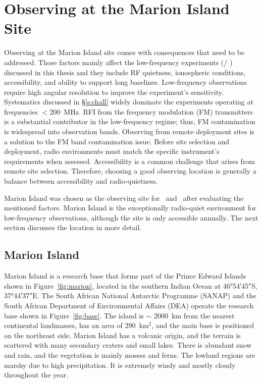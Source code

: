 \chapter{Observing at the Marion Island Site}

Observing at the Marion Island site comes with consequences that need to be addressed. Those factors mainly affect the low-frequency experiments (\prizm / \albatros) discussed in this thesis and they include RF quietness, ionospheric conditions, accessibility, and ability to support long baselines. Low-frequency observations require high angular resolution to improve the experiment's sensitivity. Systematics discussed in \S\ref{s:chall} widely dominate the experiments operating at frequencies $<$\SI{200}{MHz}. RFI from the frequency modulation (FM) transmitters is a substantial contributor in the low-frequency regime; thus, FM contamination is widespread into observation bands. Observing from remote deployment sites is a solution to the FM band contamination issue. Before site selection and deployment, radio environments must match the specific instrument's requirements when assessed. Accessibility is a common challenge that arises from remote site selection. Therefore, choosing a good observing location is generally a balance between	accessibility and radio-quietness. 

Marion Island was chosen as the observing site for \prizm\ and \albatros\ after evaluating the mentioned factors. Marion Island is the exceptionally radio-quiet environment for low-frequency observations, although the site is only accessible annually. The next section discusses the location in more detail.

\section{Marion Island}

Marion Island is a research base that forms part of the Prince Edward Islands shown in Figure~\ref{fig:marion}, located in the southern Indian Ocean at \ang{46;54;45}S, \ang{37;44;37}E. The South African National Antarctic Programme (SANAP) and the South African Department of Environmental Affairs (DEA) operate the research base shown in Figure~\ref{fig:base}. The island is $\sim$ \SI{2000}{\kilo\metre} from the nearest continental landmasses, has an area of 290~km$^2$, and the main base is positioned on the northeast side. Marion Island has a volcanic origin, and the terrain is scattered with many secondary craters and small lakes. There is abundant snow and rain, and the vegetation is mainly mosses and ferns. The lowland regions are marshy due to high precipitation. It is extremely windy and	mostly cloudy throughout the year.

